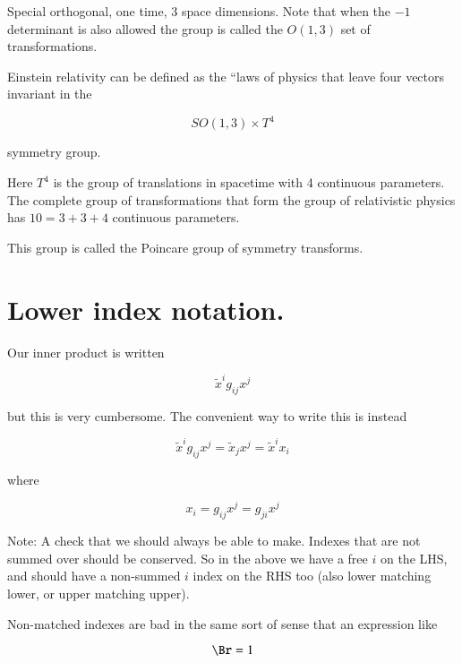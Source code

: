 Special orthogonal, one time, 3 space dimensions.  Note that when the $-1$ determinant is also allowed the group is called the $O(1,3)$ set of transformations.

Einstein relativity can be defined as the ``laws of physics that leave four vectors invariant in the

\begin{equation*}
SO(1,3) \times T^4
\end{equation*}

symmetry group.

Here $T^4$ is the group of translations in spacetime with 4 continuous parameters.   The complete group of transformations that form the group of relativistic physics has $10 = 3 + 3 + 4$ continuous parameters.

This group is called the Poincare group of symmetry transforms.

\section{Lower index notation.}

Our inner product is written

\begin{equation}\label{eqn:relativisticElectrodynamicsL6:150}
\tilde{x}^i g_{ij} x^j
\end{equation}

but this is very cumbersome.  The convenient way to write this is instead

\begin{equation}\label{eqn:relativisticElectrodynamicsL6:160}
\tilde{x}^i g_{ij} x^j = \tilde{x}_j x^j = \tilde{x}^i x_i
\end{equation}

where 

\begin{equation}\label{eqn:relativisticElectrodynamicsL6:170}
x_i = g_{ij} x^j = g_{ji} x^j
\end{equation}

Note: A check that we should always be able to make.  Indexes that are not summed over should be conserved.  So in the above we have a free $i$ on the LHS, and should have a non-summed $i$ index on the RHS too (also lower matching lower, or upper matching upper).

Non-matched indexes are bad in the same sort of sense that an expression like

\begin{equation}\label{eqn:relativisticElectrodynamicsL6:180}
\Br = 1
\end{equation}


